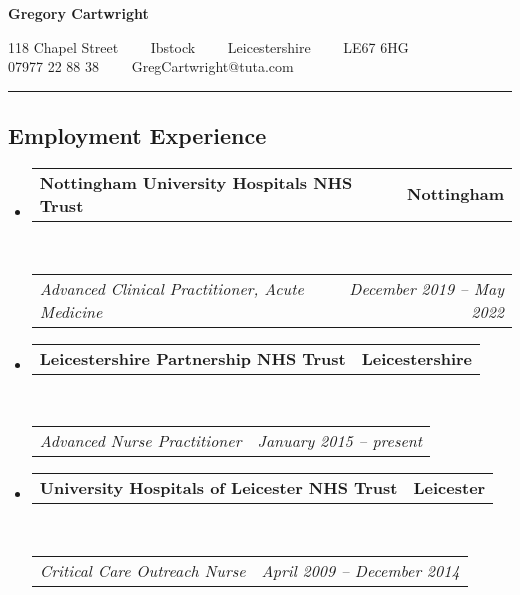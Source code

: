 \documentclass{article}
\makeatletter
\newcommand{\headerrow}[2]
{\begin{tabular*}{\linewidth}{l@{\extracolsep{\fill}}r}
	#1 &
	#2 \\
\end{tabular*}}
\makeatother
\begin{document}
\begin{center}
{\LARGE \textbf{Gregory Cartwright}}

118 Chapel Street\ \ \textbullet
\ \ Ibstock\ \ \textbullet
\ \ Leicestershire\ \ \textbullet
\ \ LE67 6HG
\\
07977 22 88 38\ \ \textbullet
\ \ GregCartwright@tuta.com
\end{center}

\hrule
\vspace{-0.4em}
\subsection*{Employment Experience}

\begin{itemize}
	\parskip=0.1em

	\item
	\headerrow
		{\textbf{Nottingham University Hospitals NHS Trust}}
		{\textbf{Nottingham}}
	\\
	\headerrow
		{\emph{Advanced Clinical Practitioner, Acute Medicine}}
		{\emph{December 2019 -- May 2022}}

	\item
	\headerrow
		{\textbf{Leicestershire Partnership NHS Trust}}
		{\textbf{Leicestershire}}
	\\
	\headerrow
		{\emph{Advanced Nurse Practitioner}}
		{\emph{January 2015 -- present}}

	\item
	\headerrow
		{\textbf{University Hospitals of Leicester NHS Trust}}
		{\textbf{Leicester}}
	\\
	\headerrow
		{\emph{Critical Care Outreach Nurse}}
		{\emph{April 2009 -- December 2014}}
	\begin{itemize*}


\end{itemize*}
\end{itemize}
\end{document}
